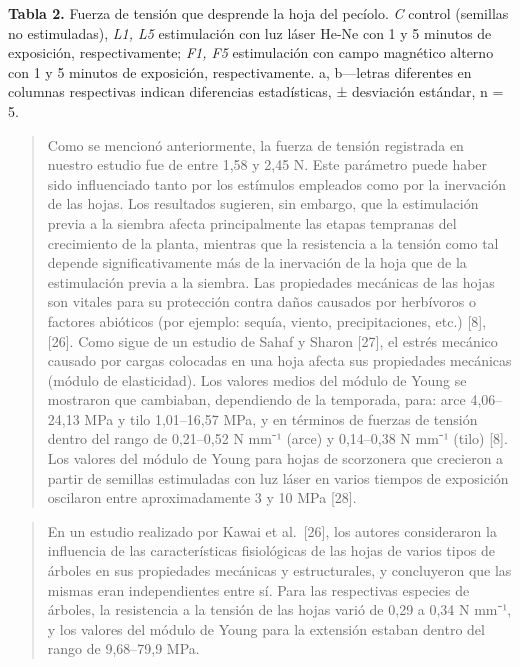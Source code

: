 \documentclass[
]{article}
\begin{document}
\textbf{Tabla 2.} Fuerza de tensión que desprende la hoja del pecíolo.
\emph{C} control (semillas no estimuladas), \emph{L1, L5} estimulación
con luz láser He-Ne con 1 y 5 minutos de exposición, respectivamente;
\emph{F1, F5} estimulación con campo magnético alterno con 1 y 5 minutos
de exposición, respectivamente. a, b---letras diferentes en columnas
respectivas indican diferencias estadísticas, ± desviación estándar, n =
5.

\begin{quote}
Como se mencionó anteriormente, la fuerza de tensión registrada en
nuestro estudio fue de entre 1,58 y 2,45 N. Este parámetro puede haber
sido influenciado tanto por los estímulos empleados como por la
inervación de las hojas. Los resultados sugieren, sin embargo, que la
estimulación previa a la siembra afecta principalmente las etapas
tempranas del crecimiento de la planta, mientras que la resistencia a la
tensión como tal depende significativamente más de la inervación de la
hoja que de la estimulación previa a la siembra. Las propiedades
mecánicas de las hojas son vitales para su protección contra daños
causados por herbívoros o factores abióticos (por ejemplo: sequía,
viento, precipitaciones, etc.) {[}8{]}, {[}26{]}. Como sigue de un
estudio de Sahaf y Sharon {[}27{]}, el estrés mecánico causado por
cargas colocadas en una hoja afecta sus propiedades mecánicas (módulo de
elasticidad). Los valores medios del módulo de Young se mostraron que
cambiaban, dependiendo de la temporada, para: arce 4,06--24,13 MPa y
tilo 1,01--16,57 MPa, y en términos de fuerzas de tensión dentro del
rango de 0,21--0,52 N mm⁻¹ (arce) y 0,14--0,38 N mm⁻¹ (tilo) {[}8{]}.
Los valores del módulo de Young para hojas de scorzonera que crecieron a
partir de semillas estimuladas con luz láser en varios tiempos de
exposición oscilaron entre aproximadamente 3 y 10 MPa {[}28{]}.
\end{quote}

\begin{quote}
En un estudio realizado por Kawai et al.~{[}26{]}, los autores
consideraron la influencia de las características fisiológicas de las
hojas de varios tipos de árboles en sus propiedades mecánicas y
estructurales, y concluyeron que las mismas eran independientes entre
sí. Para las respectivas especies de árboles, la resistencia a la
tensión de las hojas varió de 0,29 a 0,34 N mm⁻¹, y los valores del
módulo de Young para la extensión estaban dentro del rango de 9,68--79,9
MPa.
\end{quote}
\end{document}
